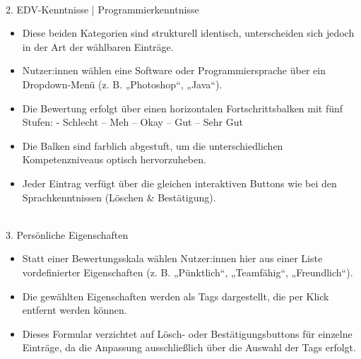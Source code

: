 \\
2. EDV-Kenntnisse | Programmierkenntnisse
\begin{itemize}
    \item Diese beiden Kategorien sind strukturell identisch, unterscheiden sich jedoch in der Art der wählbaren Einträge.
\end{itemize}

\begin{itemize}
    \item Nutzer:innen wählen eine Software oder Programmiersprache über ein Dropdown-Menü (z. B. „Photoshop“, „Java“).
\end{itemize}


\begin{itemize}
    \item Die Bewertung erfolgt über einen horizontalen Fortschrittsbalken mit fünf Stufen:
    \subitem - Schlecht – Meh – Okay – Gut – Sehr Gut
\end{itemize}

\begin{itemize}
    \item Die Balken sind farblich abgestuft, um die unterschiedlichen Kompetenzniveaus optisch hervorzuheben.
\end{itemize}

\begin{itemize}
    \item Jeder Eintrag verfügt über die gleichen interaktiven Buttons wie bei den Sprachkenntnissen (Löschen & Bestätigung).
\end{itemize}


\\
3. Persönliche Eigenschaften
\begin{itemize}
    \item Statt einer Bewertungsskala wählen Nutzer:innen hier aus einer Liste vordefinierter Eigenschaften (z. B. „Pünktlich“, „Teamfähig“, „Freundlich“).
\end{itemize}

\begin{itemize}
    \item Die gewählten Eigenschaften werden als Tags dargestellt, die per Klick entfernt werden können.
\end{itemize}

\begin{itemize}
    \item Dieses Formular verzichtet auf Lösch- oder Bestätigungsbuttons für einzelne Einträge, da die Anpassung ausschließlich über die Auswahl der Tags erfolgt.
\end{itemize}

